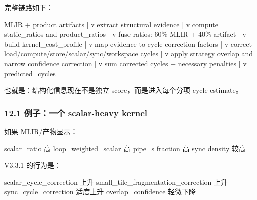 \documentclass[
  10pt,
]{article}
\newenvironment{Shaded}{}{}
\newcommand{\NormalTok}[1]{#1}
\begin{document}
完整链路如下：

\begin{Shaded}
\begin{Highlighting}[]
\NormalTok{MLIR + product artifacts}
\NormalTok{        |}
\NormalTok{        v}
\NormalTok{extract structural evidence}
\NormalTok{        |}
\NormalTok{        v}
\NormalTok{compute static\_ratios and product\_ratios}
\NormalTok{        |}
\NormalTok{        v}
\NormalTok{fuse ratios: 60\% MLIR + 40\% artifact}
\NormalTok{        |}
\NormalTok{        v}
\NormalTok{build kernel\_cost\_profile}
\NormalTok{        |}
\NormalTok{        v}
\NormalTok{map evidence to cycle correction factors}
\NormalTok{        |}
\NormalTok{        v}
\NormalTok{correct load/compute/store/scalar/sync/workspace cycles}
\NormalTok{        |}
\NormalTok{        v}
\NormalTok{apply strategy overlap and narrow confidence correction}
\NormalTok{        |}
\NormalTok{        v}
\NormalTok{sum corrected cycles + necessary penalties}
\NormalTok{        |}
\NormalTok{        v}
\NormalTok{predicted\_cycles}
\end{Highlighting}
\end{Shaded}

也就是：结构化信息现在不是独立 score，而是进入每个分项 cycle estimate。

\subsubsection{12.1 例子：一个 scalar-heavy
kernel}\label{ux4f8bux5b50ux4e00ux4e2a-scalar-heavy-kernel}

如果 MLIR/产物显示：

\begin{Shaded}
\begin{Highlighting}[]
\NormalTok{scalar\_ratio 高}
\NormalTok{loop\_weighted\_scalar 高}
\NormalTok{pipe\_s fraction 高}
\NormalTok{sync density 较高}
\end{Highlighting}
\end{Shaded}

V3.3.1 的行为是：

\begin{Shaded}
\begin{Highlighting}[]
\NormalTok{scalar\_cycle\_correction 上升}
\NormalTok{small\_tile\_fragmentation\_correction 上升}
\NormalTok{sync\_cycle\_correction 适度上升}
\NormalTok{overlap\_confidence 轻微下降}
\end{Highlighting}
\end{Shaded}
\end{document}
